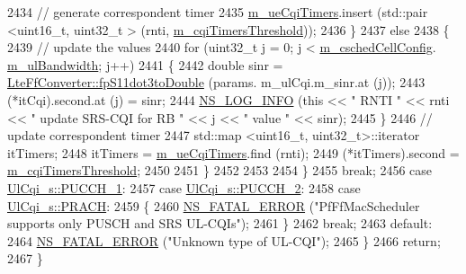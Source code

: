 \begin{DoxyCode}
2434             \textcolor{comment}{// generate correspondent timer}
2435             \hyperlink{classns3_1_1CqaFfMacScheduler_a3393d690f2b1d2a41e428b87318b15e1}{m\_ueCqiTimers}.insert (std::pair <uint16\_t, uint32\_t > (rnti, 
      \hyperlink{classns3_1_1CqaFfMacScheduler_ab2ea609b39ce10062f2bdd8027dd6edd}{m\_cqiTimersThreshold}));
2436           \}
2437         \textcolor{keywordflow}{else}
2438           \{
2439             \textcolor{comment}{// update the values}
2440             \textcolor{keywordflow}{for} (uint32\_t j = 0; j < \hyperlink{classns3_1_1CqaFfMacScheduler_ad5dc768ca3a3c71671fd64de7de8ec00}{m\_cschedCellConfig}.
      \hyperlink{structns3_1_1FfMacCschedSapProvider_1_1CschedCellConfigReqParameters_a5ab5b102878e6e7e7727a14af4a64d2f}{m\_ulBandwidth}; j++)
2441               \{
2442                 \textcolor{keywordtype}{double} sinr = \hyperlink{classns3_1_1LteFfConverter_aa5d8c2a8f988dbd63da91818c18666eb}{LteFfConverter::fpS11dot3toDouble} (params.
      m\_ulCqi.m\_sinr.at (j));
2443                 (*itCqi).second.at (j) = sinr;
2444                 \hyperlink{group__logging_gafbd73ee2cf9f26b319f49086d8e860fb}{NS\_LOG\_INFO} (\textcolor{keyword}{this} << \textcolor{stringliteral}{" RNTI "} << rnti << \textcolor{stringliteral}{" update SRS-CQI for RB  "} << j << \textcolor{stringliteral}{"
       value "} << sinr);
2445               \}
2446             \textcolor{comment}{// update correspondent timer}
2447             std::map <uint16\_t, uint32\_t>::iterator itTimers;
2448             itTimers = \hyperlink{classns3_1_1CqaFfMacScheduler_a3393d690f2b1d2a41e428b87318b15e1}{m\_ueCqiTimers}.find (rnti);
2449             (*itTimers).second = \hyperlink{classns3_1_1CqaFfMacScheduler_ab2ea609b39ce10062f2bdd8027dd6edd}{m\_cqiTimersThreshold};
2450 
2451           \}
2452 
2453 
2454       \}
2455       \textcolor{keywordflow}{break};
2456     \textcolor{keywordflow}{case} \hyperlink{structns3_1_1UlCqi__s_aece9e5ebea42eb9ff1744c72c8459b57a05ca6554bc6fcd96a0a51fbaa8e794c7}{UlCqi\_s::PUCCH\_1}:
2457     \textcolor{keywordflow}{case} \hyperlink{structns3_1_1UlCqi__s_aece9e5ebea42eb9ff1744c72c8459b57a35664b4bda6f1cd6acfe9edc84c7571d}{UlCqi\_s::PUCCH\_2}:
2458     \textcolor{keywordflow}{case} \hyperlink{structns3_1_1UlCqi__s_aece9e5ebea42eb9ff1744c72c8459b57af93f36792cb1eed08f6119e4abfe58e8}{UlCqi\_s::PRACH}:
2459       \{
2460         \hyperlink{group__fatal_ga5131d5e3f75d7d4cbfd706ac456fdc85}{NS\_FATAL\_ERROR} (\textcolor{stringliteral}{"PfFfMacScheduler supports only PUSCH and SRS UL-CQIs"});
2461       \}
2462       \textcolor{keywordflow}{break};
2463     \textcolor{keywordflow}{default}:
2464       \hyperlink{group__fatal_ga5131d5e3f75d7d4cbfd706ac456fdc85}{NS\_FATAL\_ERROR} (\textcolor{stringliteral}{"Unknown type of UL-CQI"});
2465     \}
2466   \textcolor{keywordflow}{return};
2467 \}
\end{DoxyCode}


